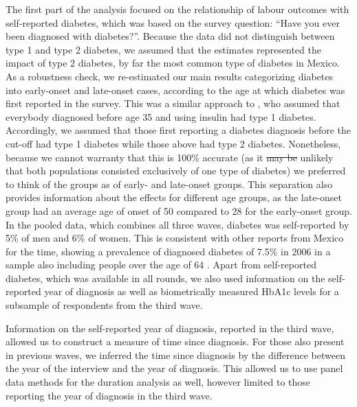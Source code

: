\documentclass[12pt,english]{article}
\providecommand{\DIFaddtex}[1]{{\protect\color{blue}\uwave{#1}}} %
\providecommand{\DIFdeltex}[1]{{\protect\color{red}\sout{#1}}}                      %
\providecommand{\DIFaddbegin}{} %
\providecommand{\DIFaddend}{} %
\providecommand{\DIFdelbegin}{} %
\providecommand{\DIFdelend}{} %
\providecommand{\DIFadd}[1]{\texorpdfstring{\DIFaddtex{#1}}{#1}} %
\providecommand{\DIFdel}[1]{\texorpdfstring{\DIFdeltex{#1}}{}} %
\begin{document}
The first part of the analysis focused on the relationship of labour outcomes with self-reported diabetes, which was based on the survey question: “Have you ever been diagnosed with diabetes?”. Because the data did not distinguish between type 1 and type 2 diabetes, we assumed that the estimates represented the impact of type 2 diabetes, by far the most common type of diabetes in Mexico. As a robustness check, we re-estimated our main results categorizing diabetes into early-onset and late-onset cases, according to the age at which diabetes was first reported in the survey. This was a similar approach to \textcite{Alegre-Diaz2016}, who assumed that everybody diagnosed before age 35 and using insulin had type 1 diabetes. Accordingly, we assumed that those first reporting a diabetes diagnosis before the cut-off had type 1 diabetes while those above had type 2 diabetes. Nonetheless, because we cannot warranty that this is 100\% accurate (as it \DIFdelbegin \DIFdel{may be }\DIFdelend \DIFaddbegin \DIFadd{is }\DIFaddend unlikely that both populations consisted exclusively of one type of diabetes) we preferred to think of the groups as of early- and late-onset groups. This separation also provides information about the effects for different age groups, as the late-onset group had an average age of onset of 50 compared to 28 for the early-onset group. In the pooled data, which combines all three waves, diabetes was self-reported by 5\% of men and 6\% of women. This is consistent with other reports from Mexico for the time, showing a prevalence of diagnosed diabetes of 7.5\% in 2006 in a sample also including people over the age of 64 \parencite{Barquera2013}. Apart from self-reported diabetes, which was available in all rounds, we also used information on the self-reported year of diagnosis as well as biometrically measured \ac{HbA1c} levels for a subsample of respondents from the third wave.


Information on the self-reported year of diagnosis, reported in the third wave, allowed us to construct a measure of time since diagnosis. For those also present in previous waves, we inferred the time since diagnosis by the difference between the year of the interview and the year of diagnosis. This allowed us to use panel data methods for the duration analysis as well, however limited to those reporting the year of diagnosis in the third wave. 
\end{document}
